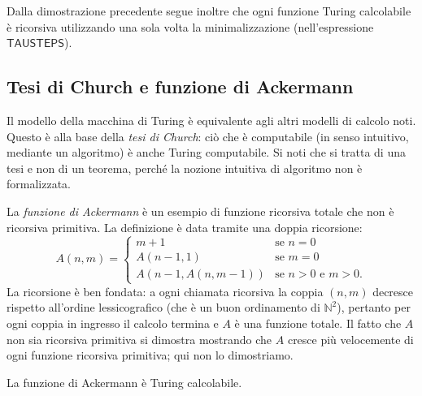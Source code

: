 \begin{rema}
Dalla dimostrazione precedente segue inoltre che ogni funzione Turing calcolabile è ricorsiva utilizzando una sola volta la minimalizzazione (nell'espressione $\mathsf{TAUSTEPS}$).
\end{rema}

\subsection{Tesi di Church e funzione di Ackermann}

Il modello della macchina di Turing è equivalente agli altri modelli di calcolo noti. Questo è alla base della \emph{tesi di Church}: ciò che è computabile (in senso intuitivo, mediante un algoritmo) è anche Turing computabile. Si noti che si tratta di una tesi e non di un teorema, perché la nozione intuitiva di algoritmo non è formalizzata.

La \emph{funzione di Ackermann} è un esempio di funzione ricorsiva totale che non è ricorsiva primitiva. La definizione è data tramite una doppia ricorsione:
\[
A(n,m)=
\begin{cases}
m+1 & \text{se } n=0\\
A(n-1,1) & \text{se } m=0\\
A(n-1,A(n,m-1)) & \text{se } n>0 \text{ e } m>0.
\end{cases}
\]
La ricorsione è ben fondata: a ogni chiamata ricorsiva la coppia $(n,m)$ decresce rispetto all'ordine lessicografico (che è un buon ordinamento di $\mathbb N^2$), pertanto per ogni coppia in ingresso il calcolo termina e $A$ è una funzione totale. Il fatto che $A$ non sia ricorsiva primitiva si dimostra mostrando che $A$ cresce più velocemente di ogni funzione ricorsiva primitiva; qui non lo dimostriamo.

\begin{prop}
La funzione di Ackermann è Turing calcolabile.
\end{prop}

